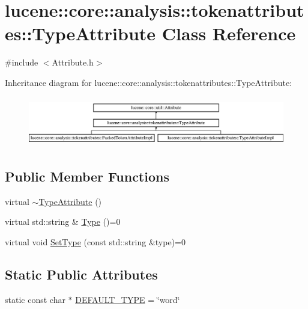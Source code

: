 \hypertarget{classlucene_1_1core_1_1analysis_1_1tokenattributes_1_1TypeAttribute}{}\section{lucene\+:\+:core\+:\+:analysis\+:\+:tokenattributes\+:\+:Type\+Attribute Class Reference}
\label{classlucene_1_1core_1_1analysis_1_1tokenattributes_1_1TypeAttribute}


{\ttfamily \#include $<$Attribute.\+h$>$}

Inheritance diagram for lucene\+:\+:core\+:\+:analysis\+:\+:tokenattributes\+:\+:Type\+Attribute\+:\begin{figure}[H]
\begin{center}
\leavevmode
\includegraphics[height=2.210526cm]{classlucene_1_1core_1_1analysis_1_1tokenattributes_1_1TypeAttribute}
\end{center}
\end{figure}
\subsection*{Public Member Functions}
\begin{DoxyCompactItemize}
\item 
virtual \mbox{\hyperlink{classlucene_1_1core_1_1analysis_1_1tokenattributes_1_1TypeAttribute_afbe663aff604b5af062b90f1e65d529e}{$\sim$\+Type\+Attribute}} ()
\item 
virtual std\+::string \& \mbox{\hyperlink{classlucene_1_1core_1_1analysis_1_1tokenattributes_1_1TypeAttribute_a85bef723dc92f76228982ff3907c5d04}{Type}} ()=0
\item 
virtual void \mbox{\hyperlink{classlucene_1_1core_1_1analysis_1_1tokenattributes_1_1TypeAttribute_abb4ecef2fd30c7b659efd7f3a2086945}{Set\+Type}} (const std\+::string \&type)=0
\end{DoxyCompactItemize}
\subsection*{Static Public Attributes}
\begin{DoxyCompactItemize}
\item 
static const char $\ast$ \mbox{\hyperlink{classlucene_1_1core_1_1analysis_1_1tokenattributes_1_1TypeAttribute_acb727b71590b34060e7d915afb885c27}{D\+E\+F\+A\+U\+L\+T\+\_\+\+T\+Y\+PE}} = \char`\"{}word\char`\"{}
\end{DoxyCompactItemize}

